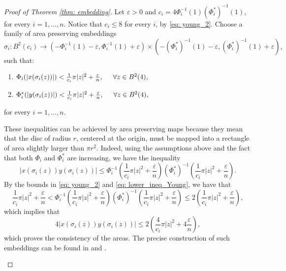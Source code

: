 \documentclass{article}
\theoremstyle{definition}
\begin{document}
\begin{proof}[Proof of Theorem \ref{thm: embedding}]
Let $\varepsilon>0$ and $c_i=4\Phi_i^{-1}(1){(\Phi^*_i)}^{-1}(1)$, for every $i=1,\ldots,n$.  Notice that $c_i\leq 8$ for every $i$, by \eqref{eq: young_2}. Choose a family of area preserving embeddings 
$$\sigma_i:B^2(c_i)\to (-\Phi_i^{-1}(1)-\varepsilon,\Phi_i^{-1}(1)+\varepsilon) \times\left(-{(\Phi^*_i)}^{-1}(1)-\varepsilon,{(\Phi^*_i)}^{-1}(1)+\varepsilon\right),$$
such that:
\begin{enumerate}[label=\roman*.]
\item \label{eq: ineq1} $\Phi_i(|x(\sigma_i(z))|)<\frac{1}{c_i}\pi|z|^2+\frac{\varepsilon}{n}, \hspace{5mm} \forall z\in B^2(4),$
\item \label{eq: ineq2} $\Phi^*_i(|y(\sigma_i(z))|)<\frac{1}{c_i}\pi|z|^2+\frac{\varepsilon}{n}, \hspace{5mm} \forall z\in B^2(4),$
\end{enumerate}
for every $i=1,\ldots,n$.

These inequalities can be achieved by area preserving maps because they mean that the disc of radius $r$, centered at the
origin, must be mapped into a rectangle of area slightly larger than $\pi r^2$. Indeed, using the assumptions above and the fact that both $\Phi_i$ and $\Phi^*_i$ are increasing, we have the inequality
$$|x(\sigma_i(z))y(\sigma_i(z))|\leq \Phi_i^{-1}\left(\frac{1}{c_i}\pi|z|^2+\frac{\varepsilon}{n}\right){(\Phi^*_i)}^{-1}\left(\frac{1}{c_i}\pi|z|^2+\frac{\varepsilon}{n}\right).$$
By the bounds in \eqref{eq: young_2} and \eqref{eq: lower_ineq_Young}, we have that 
$$\frac{1}{c_i}\pi|z|^2+\frac{\varepsilon}{n}<\Phi_i^{-1}\left(\frac{1}{c_i}\pi|z|^2+\frac{\varepsilon}{n}\right){(\Phi^*_i)}^{-1}\left(\frac{1}{c_i}\pi|z|^2+\frac{\varepsilon}{n}\right)\leq 2\left(\frac{1}{c_i}\pi|z|^2+\frac{\varepsilon}{n}\right),$$
which implies that 
$$4|x(\sigma_i(z))y(\sigma_i(z))|\leq 2\left(\frac{4}{c_i}\pi|z|^2+4\frac{\varepsilon}{n}\right),$$
which proves the consistency of the areas. The precise construction of such embeddings can be found in \cite{Schlenk2001ESchlembeddingPI} and \cite{Schlenk2005ESchlembeddingPI}.



\begin{figure}[htbp] %
    \centering %
\end{figure}
\end{proof}
\end{document}
